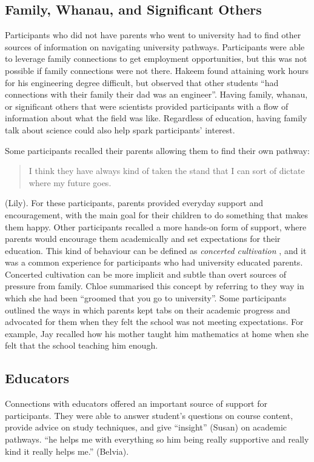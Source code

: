 \subsection{Family, Whanau, and Significant Others}
Participants who did not have parents who went to university had to find other sources of information on navigating university pathways. Participants were able to leverage family connections to get employment opportunities, but this was not possible if family connections were not there. Hakeem found attaining work hours for his engineering degree difficult, but observed that other students ``had connections with their family their dad was an engineer''. Having family, whanau, or significant others that were scientists provided participants with a flow of information about what the field was like. Regardless of education, having family talk about science could also help spark participants' interest. 

Some participants recalled their parents allowing them to find their own pathway: \blockquote{I think they have always kind of taken the stand that I can sort of dictate where my future goes.} (Lily). For these participants, parents provided everyday support and encouragement, with the main goal for their children to do something that makes them happy. Other participants recalled a more hands-on form of support, where parents would encourage them academically and set expectations for their education. This kind of behaviour can be defined as \textit{concerted cultivation} \citep{lareau2011unequal}, and it was a common experience for participants who had university educated parents. Concerted cultivation can be more implicit and subtle than overt sources of pressure from family. Chloe summarised this concept by referring to they way in which she had been ``groomed that you go to university''. Some participants outlined the ways in which parents kept tabs on their academic progress and advocated for them when they felt the school was not meeting expectations. For example, Jay recalled how his mother taught him mathematics at home when she felt that the school teaching him enough.

\subsection{Educators}
Connections with educators offered an important source of support for participants. They were able to answer student's questions on course content, provide advice on study techniques, and give ``insight'' (Susan) on academic pathways. ``he helps me with everything so him being really supportive and really kind it really helps me.'' (Belvia).

